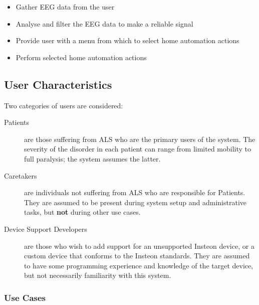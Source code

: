 \documentclass{article}
\begin{document}
\begin{itemize}
\item Gather EEG data from the user
\item Analyse and filter the EEG data to make a reliable signal
\item Provide user with a menu from which to select home automation actions
\item Perform selected home automation actions
\end{itemize}

\subsection{User Characteristics}
\label{sec:UserChar}
Two categories of users are considered:

\begin{description}
    \item[Patients] are those suffering from ALS who are the primary users of
        the system. The severity of the disorder in each patient can range
        from limited mobility to full paralysis; the system assumes the
        latter.
    \item[Caretakers] are individuals not suffering from ALS who are
        responsible for Patients. They are assumed to be present during system
        setup and administrative tasks, but \textbf{not} during other use
        cases.
    \item[Device Support Developers] are those who wish to add support for an
        unsupported Insteon device, or a custom device that conforms to the
        Insteon standards. They are assumed to have some programming
        experience and knowledge of the target device, but not necessarily
        familiarity with this system.
\end{description}

\subsubsection{Use Cases}
\end{document}

